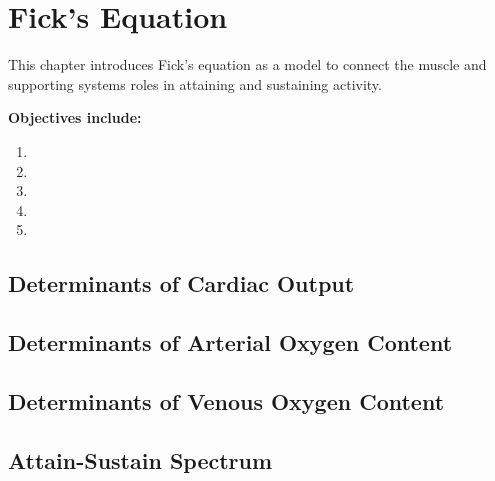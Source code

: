 \chapter{Fick's Equation}\label{chp:fick_equation}

\minitoc
This chapter introduces Fick's equation as a model to connect the muscle and supporting systems roles in attaining and sustaining activity.

\vspace{5mm}

\textbf{Objectives include:}
\begin{enumerate}
    \item
    \item
    \item
    \item
    \item
\end{enumerate}

\section{Determinants of Cardiac Output}

\section{Determinants of Arterial Oxygen Content}

\section{Determinants of Venous Oxygen Content}

\section{Attain-Sustain Spectrum}

\printbibliography[heading=subbibintoc]